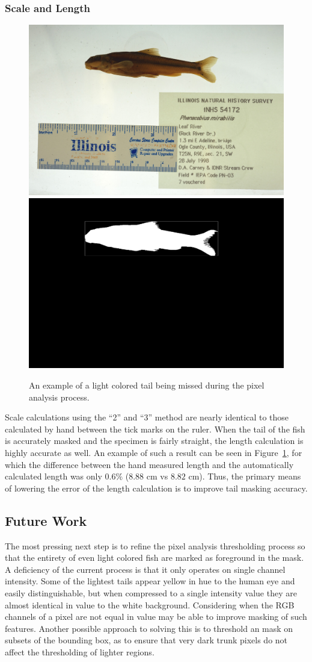 \documentclass[conference]{IEEEtran}
\begin{document}
\subsubsection{Scale and Length}
\begin{figure}[H]
  \centering
  \includegraphics[width=0.49\linewidth]{images/54172}
  \includegraphics[width=0.49\linewidth]{images/54172_mask}
  \caption{An example of a light colored tail being missed during the pixel analysis process.}
  \label{fig:scale_len}
\end{figure}
Scale calculations using the ``2'' and ``3'' method are nearly identical to those calculated by hand between the tick marks on the ruler. When the tail of the fish is accurately masked and the specimen is fairly straight, the length calculation is highly accurate as well. An example of such a result can be seen in Figure~\ref{fig:scale_len}, for which the difference between the hand measured length and the automatically calculated length was only \(0.6\%\) (\(8.88\) cm vs \(8.82\) cm). Thus, the primary means of lowering the error of the length calculation is to improve tail masking accuracy.

\subsection{Future Work}
The most pressing next step is to refine the pixel analysis thresholding process so that the entirety of even light colored fish are marked as foreground in the mask. A deficiency of the current process is that it only operates on single channel intensity. Some of the lightest tails appear yellow in hue to the human eye and easily distinguishable, but when compressed to a single intensity value they are almost identical in value to the white background. Considering when the RGB channels of a pixel are not equal in value may be able to improve masking of such features. Another possible approach to solving this is to threshold an mask on subsets of the bounding box, as to ensure that very dark trunk pixels do not affect the thresholding of lighter regions.
\end{document}
